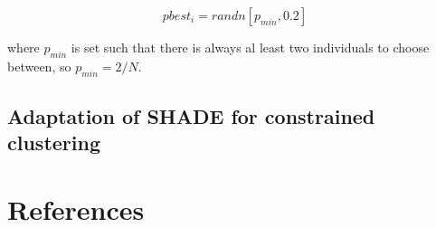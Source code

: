 \documentclass[review]{elsarticle}
\begin{document}
\begin{equation}
pbest_i = randn[p_{min}, 0.2]
\label{eq13}
\end{equation}

where $p_{min}$ is set such that there is always al least two individuals to choose between, so $p_{min} = 2/N$.

\subsection{Adaptation of SHADE for constrained clustering}

\newpage

\section*{References}


\end{document}
